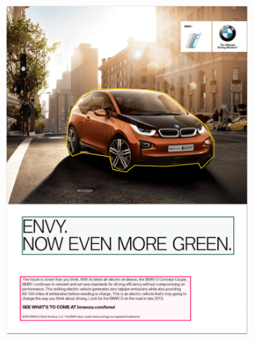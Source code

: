 \begin{figure}[!h]
\begin{subfigure}[b]{0.24\textwidth}
         \includegraphics[scale=0.22]{images/Image3.png}
     \end{subfigure}
     \begin{subfigure}[b]{0.24\textwidth}

\end{subfigure}
\end{figure}
